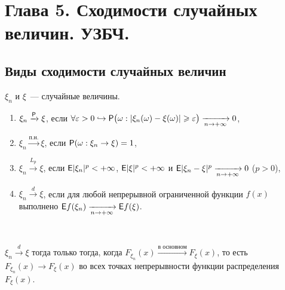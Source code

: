 \section{Глава 5. Сходимости случайных величин. УЗБЧ.}
 \subsection{Виды сходимости случайных величин}
 \begin{definition}
    $\xi_n$ и $\xi$~--- случайные величины. 
 	\begin{enumerate}
 		\item $\xi_n \xrightarrow{\P} \xi$, если 
 			$\forall \varepsilon > 0 \hookrightarrow \P\big(\omega:|\xi_n(\omega) - \xi(\omega)| 
 			\geqslant \varepsilon \big) \limn 0$,
 		\item $\xi_n \xrightarrow{\text{п.н.}} \xi$, если 
 			$\P(\omega: \xi_n \rightarrow \xi) = 1$,
 		\item $\xi_n \xrightarrow{L_p} \xi$, если $\E |\xi_n |^p < + \infty$, $\E |\xi|^p < +\infty$ и $\E | \xi_n - \xi |^p \limn 0$ ($p > 0$),
 		\item $\xi_n \xrightarrow{d} \xi$, если для любой непрерывной ограниченной функции $f(x)$ выполнено $\E f (\xi_n) \limn \E f(\xi)$.
 	\end{enumerate}
 \end{definition}
 
 \begin{theorem}[Александрова][б/д]~
 
 	$\xi_n \xrightarrow{d} \xi$ тогда только тогда, когда 
 	$F_{\xi_n}(x) \xrightarrow{\text{в основном}} F_\xi (x)$, то есть 
 	$F_{\xi_n}(x) \rightarrow F_\xi(x)$ во всех точках непрерывности 
 	функции распределения $F_\xi(x)$. 
 \end{theorem}
 
